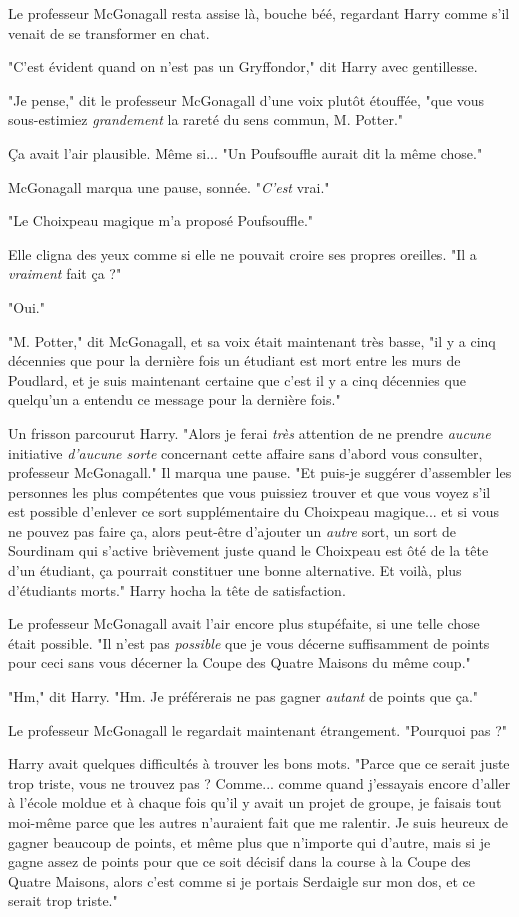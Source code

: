 Le professeur McGonagall resta assise là, bouche béé, regardant Harry comme s'il venait de se transformer en chat.

"C'est évident quand on n'est pas un Gryffondor," dit Harry avec gentillesse.

"Je pense," dit le professeur McGonagall d'une voix plutôt étouffée, "que vous sous-estimiez \emph{grandement}  la rareté du sens commun, M. Potter."

Ça avait l'air plausible. Même si... "Un Poufsouffle aurait dit la même chose."

McGonagall marqua une pause, sonnée. "\emph{C'est}  vrai."

"Le Choixpeau magique m'a proposé Poufsouffle."

Elle cligna des yeux comme si elle ne pouvait croire ses propres oreilles. "Il a \emph{vraiment}  fait ça ?"

"Oui."

"M. Potter," dit McGonagall, et sa voix était maintenant très basse, "il y a cinq décennies que pour la dernière fois un étudiant est mort entre les murs de Poudlard, et je suis maintenant certaine que c'est il y a cinq décennies que quelqu'un a entendu ce message pour la dernière fois."

Un frisson parcourut Harry. "Alors je ferai \emph{très}  attention de ne prendre \emph{aucune}  initiative \emph{d'aucune sorte}  concernant cette affaire sans d'abord vous consulter, professeur McGonagall." Il marqua une pause. "Et puis-je suggérer d'assembler les personnes les plus compétentes que vous puissiez trouver et que vous voyez s'il est possible d'enlever ce sort supplémentaire du Choixpeau magique... et si vous ne pouvez pas faire ça, alors peut-être d'ajouter un \emph{autre}  sort, un sort de Sourdinam qui s'active brièvement juste quand le Choixpeau est ôté de la tête d'un étudiant, ça pourrait constituer une bonne alternative. Et voilà, plus d'étudiants morts." Harry hocha la tête de satisfaction.

Le professeur McGonagall avait l'air encore plus stupéfaite, si une telle chose était possible. "Il n'est pas \emph{possible}  que je vous décerne suffisamment de points pour ceci sans vous décerner la Coupe des Quatre Maisons du même coup."

"Hm," dit Harry. "Hm. Je préférerais ne pas gagner \emph{autant}  de points que ça."

Le professeur McGonagall le regardait maintenant étrangement. "Pourquoi pas ?"

Harry avait quelques difficultés à trouver les bons mots. "Parce que ce serait juste trop triste, vous ne trouvez pas ? Comme... comme quand j'essayais encore d'aller à l'école moldue et à chaque fois qu'il y avait un projet de groupe, je faisais tout moi-même parce que les autres n'auraient fait que me ralentir. Je suis heureux de gagner beaucoup de points, et même plus que n'importe qui d'autre, mais si je gagne assez de points pour que ce soit décisif dans la course à la Coupe des Quatre Maisons, alors c'est comme si je portais Serdaigle sur mon dos, et ce serait trop triste."

